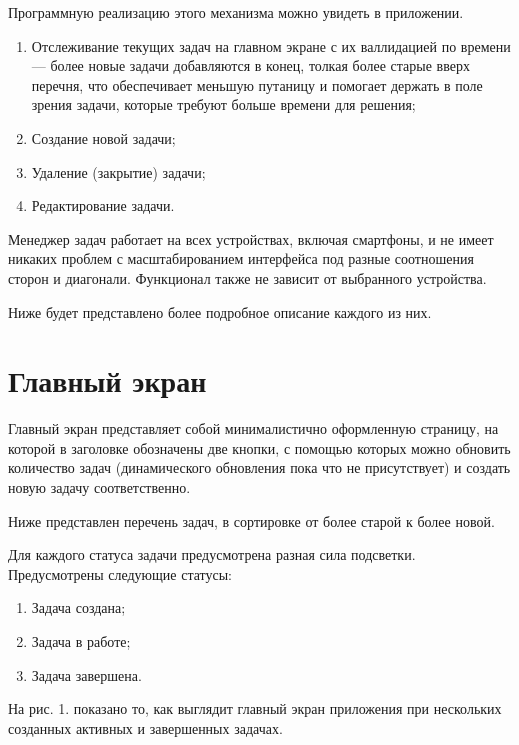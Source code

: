 \documentclass{altsu-report}
\begin{document}
Программную реализацию этого механизма можно увидеть в приложении.

\begin{enumerate}
    \item Отслеживание текущих задач на главном экране с их валлидацией по времени --- более новые задачи добавляются в конец, толкая более старые вверх перечня, что обеспечивает меньшую путаницу и помогает держать в поле зрения задачи, которые требуют больше времени для решения;
    \item Создание новой задачи;
    \item Удаление (закрытие) задачи;
    \item Редактирование задачи.
\end{enumerate}

Менеджер задач работает на всех устройствах, включая смартфоны, и не имеет никаких проблем с масштабированием интерфейса под разные соотношения сторон и диагонали. Функционал также не зависит от выбранного устройства.

Ниже будет представлено более подробное описание каждого из них.

\section*{Главный экран}

Главный экран представляет собой минималистично оформленную страницу, на которой в заголовке обозначены две кнопки, с помощью которых можно обновить количество задач (динамического обновления пока что не присутствует) и создать новую задачу соответственно.

Ниже представлен перечень задач, в сортировке от более старой к более новой.

Для каждого статуса задачи предусмотрена разная сила подсветки. Предусмотрены следующие статусы:

\begin{enumerate}
    \item Задача создана;

    \item Задача в работе;

    \item Задача завершена.
\end{enumerate}

На рис. 1. показано то, как выглядит главный экран приложения при нескольких созданных активных и завершенных задачах.
\end{document}
